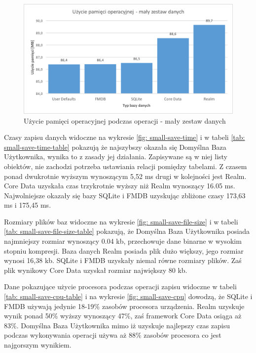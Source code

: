 \begin{figure}[h]
\centering
	\includegraphics[width=15cm]{img/save_data/save_ram_small.png}
	\caption{Użycie pamięci operacyjnej podczas operacji - mały zestaw danych}
	\label{fig: small-save-ram}
\end{figure}

\newpage

Czasy zapisu danych widoczne na wykresie \ref{fig: small-save-time} i w tabeli \ref{tab: small-save-time-table} pokazują że najszybszy okazała się Domyślna Baza Użytkownika, wynika to z zasady jej działania. Zapisywane są w niej listy obiektów, nie zachodzi potrzeba ustawiania relacji pomiędzy tabelami. Z czasem ponad dwukrotnie wyższym wynoszącym 5,52 ms drugi w kolejności jest Realm. Core Data uzyskała czas trzykrotnie wyższy niż Realm wynoszący 16.05 ms. Najwolniejsze okazały się bazy SQLite i FMDB uzyskując zbliżone czasy 173,63 ms i 175,45 ms. \par 

Rozmiary plików baz widoczne na wykresie \ref{fig: small-save-file-size} i w tabeli \ref{tab: small-save-file-size-table} pokazują, że Domyślna Baza Użytkownika posiada najmniejszy rozmiar wynoszący 0.04 kb, przechowuje dane binarne w wysokim stopniu kompresji. Baza danych Realm posiada plik dużo większy, jego rozmiar wynosi 16,38 kb. SQLite i FMDB uzyskały niemal równe rozmiary plików. Zaś plik wynikowy Core Data uzyskał rozmiar największy 80 kb. \par

Dane pokazujące użycie procesora podczas operacji zapisu widoczne w tabeli \ref{tab: small-save-cpu-table} i na wykresie \ref{fig: small-save-cpu} dowodzą, że SQLite i FMDB używają jedynie 18-19\% zasobów procesora urządzenia. Realm uzyskuje wynik ponad 50\% wyższy wynoszący 47\%, zaś framework Core Data osiąga aż 83\%. Domyślna Baza Użytkownika mimo iż uzyskuje najlepszy czas zapisu podczas wykonywania operacji używa aż 88\% zasobów procesora co jest najgorszym wynikiem.\par 

